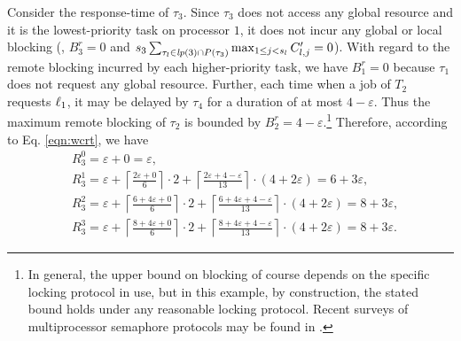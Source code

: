 Consider the response-time of $\tau_3$. Since $\tau_3$ does not access any global resource and it is the lowest-priority task on processor $1$, it does not incur any global or local blocking (\ie, $B_3^r = 0$ and $s_3 \sum_{\tau_l \in \mathit{lp}(3) \cap P(\tau_3)} \max_{1 \leq j < s_l} C_{l,j}^{\prime} = 0$). With regard to the remote blocking incurred by each higher-priority task, we have $B_1^r = 0$ because $\tau_1$ does not request any global resource. Further, each time when a job of $T_2$ requests $\ell_1$, it may be delayed by $\tau_4$ for a duration of at most $4-\varepsilon$. Thus the maximum remote blocking of $\tau_2$ is bounded by $B_2^r = 4-\varepsilon$.\footnote{In general, the upper bound on blocking of course depends on the specific locking protocol in use, but in this example, by construction, the stated bound holds under any reasonable locking protocol. Recent surveys of multiprocessor semaphore protocols may be found in \cite{bbb-2013,yang-2015}.} Therefore, according to Eq. \eqref{eqn:wcrt}, we have
\begin{align*}
& R_3^0 = \varepsilon + 0 = \varepsilon, \\
& R_3^1 = \varepsilon + \left \lceil \frac{2\varepsilon + 0}{6} \right \rceil \cdot 2 + \left \lceil \frac{2\varepsilon + 4 - \varepsilon}{13} \right \rceil \cdot (4+2\varepsilon) =  6+3\varepsilon, \\
& R_3^2 = \varepsilon + \left \lceil \frac{6+4\varepsilon + 0}{6} \right \rceil \cdot 2 + \left \lceil \frac{6+4\varepsilon + 4-\varepsilon}{13} \right \rceil \cdot (4+2\varepsilon) = 8+3\varepsilon, \\
& R_3^3 = \varepsilon + \left \lceil \frac{8+4\varepsilon + 0}{6} \right \rceil \cdot 2 + \left \lceil \frac{8+4\varepsilon + 4-\varepsilon}{13} \right \rceil \cdot (4+2\varepsilon) = 8+3\varepsilon.
\end{align*}


